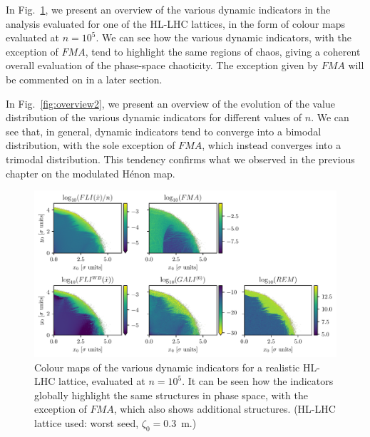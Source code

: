 
In Fig.~\ref{fig:overview}, we present an overview of the various dynamic indicators in the analysis evaluated for one of the HL-LHC lattices, in the form of colour maps evaluated at $n=10^5$. We can see how the various dynamic indicators, with the exception of $FMA$, tend to highlight the same regions of chaos, giving a coherent overall evaluation of the phase-space chaoticity. The exception given by $FMA$ will be commented on in a later section. 

In Fig.~\ref{fig:overview2}, we present an overview of the evolution of the value distribution of the various dynamic indicators for different values of $n$. We can see that, in general, dynamic indicators tend to converge into a bimodal distribution, with the sole exception of $FMA$, which instead converges into a trimodal distribution. This tendency confirms what we observed in the previous chapter on the modulated Hénon map.

\begin{figure}
    \centering
    \includegraphics[width=1.0\textwidth]{6_lhc_dynamic_indicators/figs/updated/overview.pdf}
    \caption{Colour maps of the various dynamic indicators for a realistic HL-LHC lattice, evaluated at $n=10^5$. It can be seen how the indicators globally highlight the same structures in phase space, with the exception of $FMA$, which also shows additional structures. (HL-LHC lattice used: worst seed, $\zeta_0=$\SI{0.3}{\meter}.)}
    \label{fig:overview}
\end{figure}

